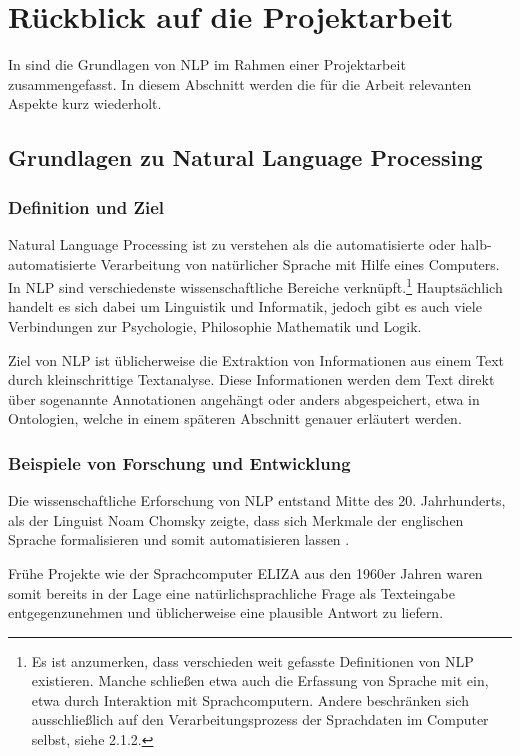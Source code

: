 \documentclass[12pt]{report}
\begin{document}
\section[Rückblick auf die PA]{Rückblick auf die Projektarbeit}
In \cite{rs18} sind die Grundlagen von NLP im Rahmen einer Projektarbeit zusammengefasst. In diesem Abschnitt werden die für die Arbeit relevanten Aspekte kurz wiederholt. 
\subsection{Grundlagen zu Natural Language Processing}
\subsubsection{Definition und Ziel}
Natural Language Processing ist zu verstehen als die automatisierte oder halb-automatisierte Verarbeitung von natürlicher Sprache mit Hilfe eines Computers. In NLP sind verschiedenste wissenschaftliche Bereiche verknüpft.\footnote{Es ist anzumerken, dass verschieden weit gefasste Definitionen von NLP existieren. Manche schließen etwa auch die Erfassung von Sprache mit ein, etwa durch Interaktion mit Sprachcomputern. Andere beschränken sich ausschließlich auf den Verarbeitungsprozess der Sprachdaten im Computer selbst, siehe 2.1.2.} Hauptsächlich handelt es sich dabei um Linguistik und Informatik, jedoch gibt es auch viele Verbindungen zur Psychologie, Philosophie Mathematik und Logik. \cite{cop04}

Ziel von NLP ist üblicherweise die Extraktion von Informationen aus einem Text durch kleinschrittige Textanalyse. Diese Informationen werden dem Text direkt über sogenannte Annotationen angehängt oder anders abgespeichert, etwa in Ontologien, welche in einem späteren Abschnitt genauer erläutert werden.

\subsubsection{Beispiele von Forschung und Entwicklung}
Die wissenschaftliche Erforschung von NLP entstand Mitte des 20. Jahrhunderts, als der Linguist Noam Chomsky zeigte, dass sich Merkmale der englischen Sprache formalisieren und somit automatisieren lassen \cite{cho57}. 

Frühe Projekte wie der Sprachcomputer ELIZA aus den 1960er Jahren waren somit bereits in der Lage eine natürlichsprachliche Frage als Texteingabe entgegenzunehmen und üblicherweise eine plausible Antwort zu liefern.   
\end{document}
